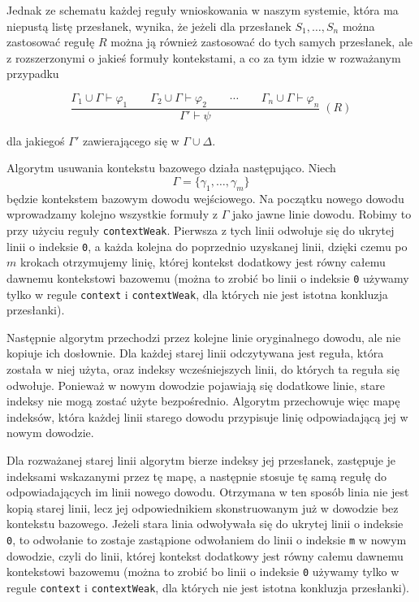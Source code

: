\documentclass[shortabstract]{iithesis}
\theoremstyle{definition}
\theoremstyle{remark}
\theoremstyle{plain}
\begin{document}
Jednak ze schematu każdej reguły wnioskowania w naszym systemie, która ma niepustą listę przesłanek, 
wynika, że jeżeli dla przesłanek \(S_1,\ldots,S_n\) można zastosować regułę \(R\) 
można ją również zastosować do tych samych przesłanek, ale z rozszerzonymi o jakieś formuły kontekstami, a co za tym idzie w rozważanym przypadku


\[
\frac{
    \Gamma_1 \cup \Gamma \vdash \varphi_1
    \qquad
    \Gamma_2 \cup \Gamma \vdash \varphi_2
    \qquad
    \cdots
    \qquad
    \Gamma_n \cup \Gamma \vdash \varphi_n
}{
    \Gamma ' \vdash \psi
}\;(R)
\]

dla jakiegoś \(\Gamma'\) zawierającego się w \(\Gamma \cup \Delta\).




Algorytm usuwania kontekstu bazowego działa następująco. Niech
\[
    \Gamma = \{\gamma_1,\ldots,\gamma_m\}
\]
będzie kontekstem bazowym dowodu wejściowego. Na początku nowego dowodu
wprowadzamy kolejno wszystkie formuły z \(\Gamma\) jako jawne linie dowodu.
Robimy to przy użyciu reguły \texttt{contextWeak}. Pierwsza z tych linii odwołuje
się do ukrytej linii o indeksie \texttt{0}, a każda kolejna do poprzednio uzyskanej linii, dzięki
czemu po \(m\) krokach otrzymujemy linię, której kontekst dodatkowy jest równy całemu
dawnemu kontekstowi bazowemu (można to zrobić bo linii o indeksie \texttt{0} używamy tylko w regule \texttt{context} i 
\texttt{contextWeak}, dla których nie jest istotna konkluzja przesłanki).

Następnie algorytm przechodzi przez kolejne linie oryginalnego dowodu, ale nie
kopiuje ich dosłownie. Dla każdej starej linii odczytywana jest reguła, która została
w niej użyta, oraz indeksy wcześniejszych linii, do których ta reguła się odwołuje.
Ponieważ w nowym dowodzie pojawiają się dodatkowe linie, stare indeksy nie mogą
zostać użyte bezpośrednio. Algorytm przechowuje więc mapę indeksów, która każdej
linii starego dowodu przypisuje linię odpowiadającą jej w nowym dowodzie.

Dla rozważanej starej linii algorytm bierze indeksy jej przesłanek, zastępuje je
indeksami wskazanymi przez tę mapę, a następnie stosuje tę samą regułę do
odpowiadających im linii nowego dowodu. Otrzymana w ten sposób linia nie jest
kopią starej linii, lecz jej odpowiednikiem skonstruowanym już w dowodzie bez
kontekstu bazowego. Jeżeli stara linia odwoływała się do ukrytej linii o indeksie \texttt{0},
to odwołanie to zostaje zastąpione odwołaniem do linii o indeksie \texttt{m} w nowym dowodzie, czyli do linii, której kontekst dodatkowy
 jest równy całemu dawnemu kontekstowi bazowemu (można to zrobić bo linii o indeksie \texttt{0} używamy tylko w regule \texttt{context} i 
\texttt{contextWeak}, dla których nie jest istotna konkluzja przesłanki).
\end{document}
